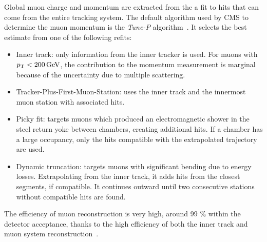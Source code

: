 Global muon charge and momentum are extracted from the a fit to hits that can come from the entire tracking system.
The default algorithm used by CMS to determine the muon momentum is the \textit{Tune-P} algorithm~\cite{CMS-MUO-10-004}.
It selects the best estimate from one of the following refits:
\begin{itemize}
\item Inner track: only information from the inner tracker is used.
  For muons with $p_{\mathrm{T}} < 200\,\text{Ge\hspace{-.08em}V}$, the contribution to the momentum measurement is marginal because of the uncertainty due to multiple scattering.
\item Tracker-Plus-First-Muon-Station: uses the inner track and the innermost muon station with associated hits.
\item Picky fit: targets muons which produced an electromagnetic shower in the steel return yoke between chambers, creating additional hits.
  If a chamber has a large occupancy, only the hits compatible with the extrapolated trajectory are used.
\item Dynamic truncation: targets muons with significant bending due to energy losses.
  Extrapolating from the inner track, it adds hits from the closest segments, if compatible.
  It continues outward until two consecutive stations without compatible hits are found.
\end{itemize}

The efficiency of muon reconstruction is very high, around 99 \% within the detector acceptance,
thanks to the high efficiency of both the inner track and muon system reconstruction~\cite{CMS-MUO-16-001}.
